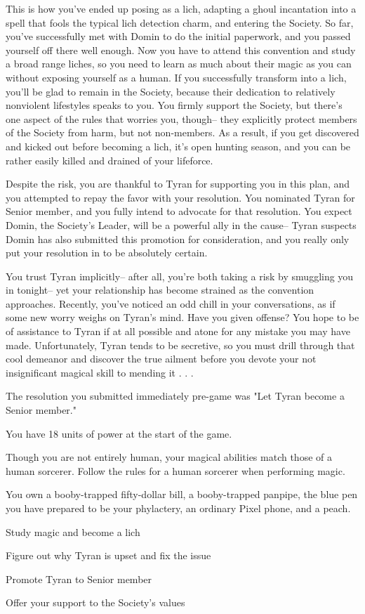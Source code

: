 \documentclass[char]{Sel}
\begin{document}
This is how you've ended up posing as a lich, adapting a ghoul incantation into a spell that fools the typical lich detection charm, and entering the Society. So far, you've successfully met with Domin to do the initial paperwork, and you passed yourself off there well enough. Now you have to attend this convention and study a broad range liches, so you need to learn as much about their magic as you can without exposing yourself as a human. If you successfully transform into a lich, you'll be glad to remain in the Society, because their dedication to relatively nonviolent lifestyles speaks to you. You firmly support the Society, but there's one aspect of the rules that worries you, though-- they explicitly protect members of the Society from harm, but not non-members. As a result, if you get discovered and kicked out before becoming a lich, it's open hunting season, and you can be rather easily killed and drained of your lifeforce.

Despite the risk, you are thankful to Tyran for supporting you in this plan, and you attempted to repay the favor with your resolution. You nominated Tyran for Senior member, and you fully intend to advocate for that resolution. You expect Domin, the Society’s Leader, will be a powerful ally in the cause-- Tyran suspects Domin has also submitted this promotion for consideration, and you really only put your resolution in to be absolutely certain.

You trust Tyran implicitly-- after all, you're both taking a risk by smuggling you in tonight-- yet your relationship has become strained as the convention approaches. Recently, you've noticed an odd chill in your conversations, as if some new worry weighs on Tyran's mind. Have you given offense? You hope to be of assistance to Tyran if at all possible and atone for any mistake you may have made. Unfortunately, Tyran tends to be secretive, so you must drill through that cool demeanor and discover the true ailment before you devote your not insignificant magical skill to mending it . . .

\begin{itemz}[Notes]
  \item The resolution you submitted immediately pre-game was "Let Tyran become a Senior member."
      \item You have 18 units of power at the start of the game.
   \item Though you are not entirely human, your magical abilities match those of a human sorcerer. Follow the rules for a human sorcerer when performing magic.
   \item You own a booby-trapped fifty-dollar bill, a booby-trapped panpipe, the blue pen you have prepared to be your phylactery, an ordinary Pixel phone, and a peach.
    \end{itemz}
   
  
    
 \begin{itemz}[Goals]
\item Study magic and become a lich
\item Figure out why Tyran is upset and fix the issue
\item Promote Tyran to Senior member 
\item Offer your support to the Society's values
\end{itemz}
\end{document}
